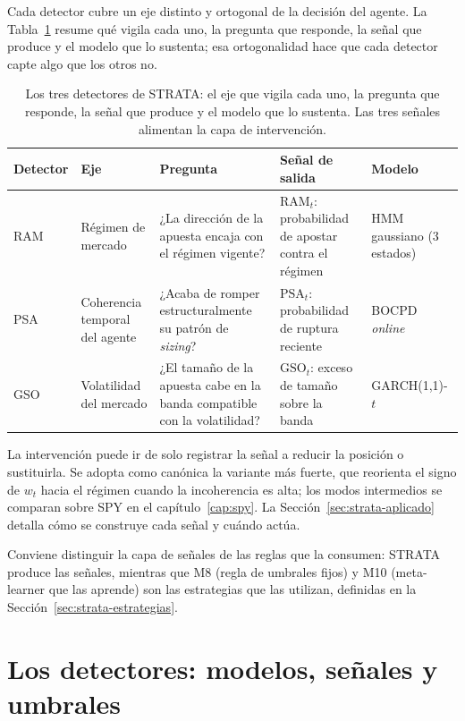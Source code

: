 Cada detector cubre un eje distinto y ortogonal de la decisión del agente. La Tabla~\ref{tab:strata-detectores} resume qué vigila cada uno, la pregunta que responde, la señal que produce y el modelo que lo sustenta; esa ortogonalidad hace que cada detector capte algo que los otros no.

\begin{table}[htbp]
\centering
\small
\caption{Los tres detectores de STRATA: el eje que vigila cada uno, la pregunta que responde, la señal que produce y el modelo que lo sustenta. Las tres señales alimentan la capa de intervención.}
\label{tab:strata-detectores}
\begin{tabular}{@{}l p{2.4cm} p{4.0cm} p{3.2cm} p{2.3cm}@{}}
\toprule
Detector & Eje & Pregunta & Señal de salida & Modelo \\
\midrule
RAM & Régimen de mercado &
¿La dirección de la apuesta encaja con el régimen vigente? &
$\mathrm{RAM}_t$: probabilidad de apostar contra el régimen &
HMM gaussiano (3 estados) \\
\addlinespace
PSA & Coherencia temporal del agente &
¿Acaba de romper estructuralmente su patrón de \emph{sizing}? &
$\mathrm{PSA}_t$: probabilidad de ruptura reciente &
BOCPD \emph{online} \\
\addlinespace
GSO & Volatilidad del mercado &
¿El tamaño de la apuesta cabe en la banda compatible con la volatilidad? &
$\mathrm{GSO}_t$: exceso de tamaño sobre la banda &
GARCH(1,1)-$t$ \\
\bottomrule
\end{tabular}
\end{table}

La intervención puede ir de solo registrar la señal a reducir la posición o sustituirla. Se adopta como canónica la variante más fuerte, que reorienta el signo de $w_t$ hacia el régimen cuando la incoherencia es alta; los modos intermedios se comparan sobre SPY en el capítulo~\ref{cap:spy}. La Sección~\ref{sec:strata-aplicado} detalla cómo se construye cada señal y cuándo actúa.

Conviene distinguir la capa de señales de las reglas que la consumen: STRATA produce las señales, mientras que M8 (regla de umbrales fijos) y M10 (meta-learner que las aprende) son las estrategias que las utilizan, definidas en la Sección~\ref{sec:strata-estrategias}.

\section{Los detectores: modelos, señales y umbrales}
\label{sec:strata-detectores}

